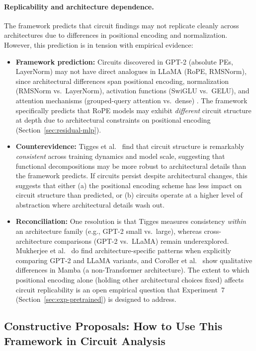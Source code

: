 \documentclass[11pt]{article}
\theoremstyle{definition}
\begin{document}
\paragraph{Replicability and architecture dependence.}
The framework predicts that circuit findings may not replicate cleanly across architectures due to differences in positional encoding and normalization. However, this prediction is in tension with empirical evidence:
\begin{itemize}
    \item \textbf{Framework prediction:} Circuits discovered in GPT-2 (absolute PEs, LayerNorm) may not have direct analogues in LLaMA (RoPE, RMSNorm), since architectural differences span positional encoding, normalization (RMSNorm vs.\ LayerNorm), activation functions (SwiGLU vs.\ GELU), and attention mechanisms (grouped-query attention vs.\ dense) \cite{mukherjee2024gpt2llama}. The framework specifically predicts that RoPE models may exhibit \emph{different} circuit structure at depth due to architectural constraints on positional encoding (Section~\ref{sec:residual-mlp}).
    \item \textbf{Counterevidence:} Tigges et al.\ \cite{tigges2024circuits} find that circuit structure is remarkably \emph{consistent} across training dynamics and model scale, suggesting that functional decompositions may be more robust to architectural details than the framework predicts. If circuits persist despite architectural changes, this suggests that either (a) the positional encoding scheme has less impact on circuit structure than predicted, or (b) circuits operate at a higher level of abstraction where architectural details wash out.
    \item \textbf{Reconciliation:} One resolution is that Tigges measures consistency \emph{within} an architecture family (e.g., GPT-2 small vs.\ large), whereas cross-architecture comparisons (GPT-2 vs.\ LLaMA) remain underexplored. Mukherjee et al.\ \cite{mukherjee2024gpt2llama} do find architecture-specific patterns when explicitly comparing GPT-2 and LLaMA variants, and Coroller et al.\ \cite{coroller2024mamba} show qualitative differences in Mamba (a non-Transformer architecture). The extent to which positional encoding alone (holding other architectural choices fixed) affects circuit replicability is an open empirical question that Experiment~7 (Section~\ref{sec:exp-pretrained}) is designed to address.
\end{itemize}

\subsection{Constructive Proposals: How to Use This Framework in Circuit Analysis}
\end{document}
